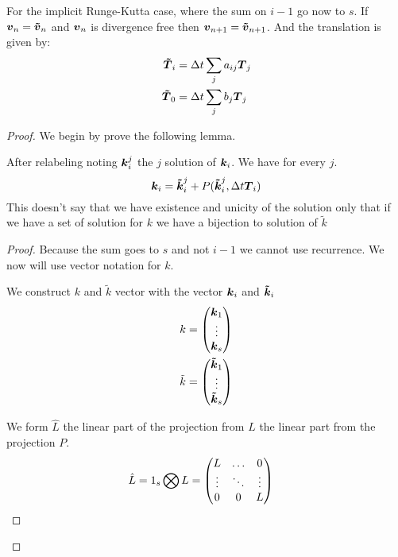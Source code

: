\begin{theorem}
For the implicit Runge-Kutta case, where the sum on $i-1$ go now to $s$.
If ${\boldsymbol {v}}_{n}={\boldsymbol {\tilde{v}}}_{n}$ and ${\boldsymbol {v}}_n$ is divergence free then ${\boldsymbol {v}}_{n+1}={\boldsymbol {\tilde{v}}}_{n+1}$.
And the translation is given by:
\begin{align}
  {\boldsymbol {\tilde{T}}}_{i}&=\Delta t\sum_{j}a_{ij}{\boldsymbol {T}}_{j}\\
  {\boldsymbol {\tilde{T}}}_{0}&=\Delta t\sum_{j}b_{j}{\boldsymbol {T}}_{j}
\end{align}

\end{theorem}
\begin{proof}
We begin by prove the following lemma.
\begin{lemma}
After relabeling noting ${\boldsymbol {k}}_{i}^{j}$ the $j$ solution of ${\boldsymbol {k}}_{i}$.
We have for every $j$.
\begin{equation}
  {\boldsymbol {k}}_{i}={\boldsymbol {\tilde{k}}}_{i}^{j}+P({\boldsymbol {\tilde{k}}}_{i}^{j},\Delta t {\boldsymbol {T}}_{i})
\end{equation}
This doesn't say that we have existence and unicity of the solution only that if we have a set of solution for $k$ we have a bijection
to solution of $\tilde{k}$
\end{lemma}
\begin{proof}
Because the sum goes to $s$ and not $i-1$ we cannot use recurrence.
We now will use vector notation for $k$.

We construct $k$ and $\tilde{k}$ vector with the vector ${\boldsymbol {k}}_{i}$ and ${\boldsymbol {\tilde{k}}}_{i}$
\begin{align}
k&=\begin{pmatrix}
    {\boldsymbol {k}}_{1}\\
    \vdots\\
    {\boldsymbol {k}}_{s}\\
  \end{pmatrix}\\
\tilde{k}&=\begin{pmatrix}
    {\boldsymbol {\tilde{k}}}_{1}\\
    \vdots\\
    {\boldsymbol {\tilde{k}}}_{s}\\
  \end{pmatrix}
\end{align}

We form $\hat{L}$ the linear part of the projection from $L$ the linear part from the projection $P$.
\begin{align}
\hat{L}&=1_{s}\bigotimes L=\begin{pmatrix}L	&\ldots	&0\\
			\vdots &\ddots 	&\vdots\\
			0	&0	&L\\
	\end{pmatrix}
\end{align}



\end{proof}
\end{proof}
